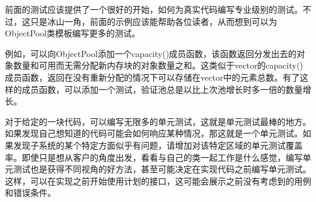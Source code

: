 
前面的测试应该提供了一个很好的开始，如何为真实代码编写专业级别的测试。不过，这只是冰山一角，前面的示例应该能帮助各位读者，从而想到可以为ObjectPool类模板编写更多的测试。

例如，可以向ObjectPool添加一个capacity()成员函数，该函数返回分发出去的对象数量和可用而无需分配新内存块的对象数量之和。这类似于vector的capacity()成员函数，返回在没有重新分配的情况下可以存储在vector中的元素总数。有了这样的成员函数，可以添加一个测试，验证池总是以比上次池增长时多一倍的数量增长。

对于给定的一块代码，可以编写无限多的单元测试，这就是单元测试最棒的地方。如果发现自己想知道的代码可能会如何响应某种情况，那这就是一个单元测试。如果发现子系统的某个特定方面似乎有问题，请增加对该特定区域的单元测试覆盖率。即使只是想从客户的角度出发，看看与自己的类一起工作是什么感觉，编写单元测试也是获得不同视角的好方法，甚至可能决定在实现代码之前编写单元测试。这样，可以在实现之前开始使用计划的接口，这可能会展示之前没有考虑到的用例和错误条件。



















